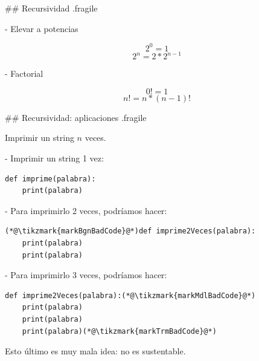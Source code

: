 ## Recursividad {.fragile}


- Elevar a potencias

$$ 2^0 = 1 $$
$$ 2^n = 2 * 2^{n-1} $$

- Factorial

$$ 0! = 1 $$
$$ n! = n * (n-1)! $$

## Recursividad: aplicaciones {.fragile}

\bgnblockgood
{} Imprimir un string $n$ veces.
\trmblockgood

\pause
\vspace{1ex}


\bgncolumns[-4ex]

- Imprimir un string 1 vez:


\begin{lstlisting}
def imprime(palabra):
    print(palabra)
\end{lstlisting}

\trmcolumns

\pause

\bgncolumns[-2ex]

- Para imprimirlo 2 veces, podríamos hacer:


\begin{lstlisting}
(*@\tikzmark{markBgnBadCode}@*)def imprime2Veces(palabra):
    print(palabra)
    print(palabra)
\end{lstlisting}

\trmcolumns

\bgncolumns[-2ex]

- Para imprimirlo 3 veces, podríamos hacer:


\begin{lstlisting}
def imprime2Veces(palabra):(*@\tikzmark{markMdlBadCode}@*)
    print(palabra)
    print(palabra)
    print(palabra)(*@\tikzmark{markTrmBadCode}@*)
\end{lstlisting}

\trmcolumns

\pause

\vspace{-2ex}
\bgnblockdanger
Esto último es muy mala idea: no es sustentable.
\trmblockdanger

